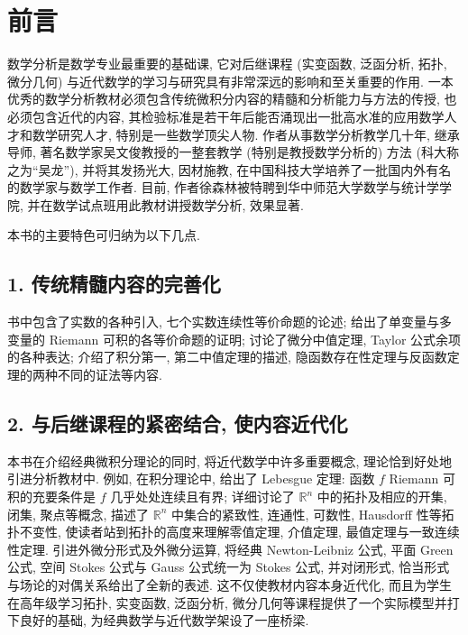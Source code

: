 
\chapter*{前言}

数学分析是数学专业最重要的基础课, 它对后继课程 (实变函数, 泛函分析, 拓扑, 微分几何) 与近代数学的学习与研究具有非常深远的影响和至关重要的作用. 一本优秀的数学分析教材必须包含传统微积分内容的精髓和分析能力与方法的传授, 也必须包含近代的内容, 其检验标准是若干年后能否涌现出一批高水准的应用数学人才和数学研究人才, 特别是一些数学顶尖人物. 作者从事数学分析教学几十年, 继承导师, 著名数学家吴文俊教授的一整套教学 (特别是教授数学分析的) 方法 (科大称之为``吴龙''), 并将其发扬光大, 因材施教, 在中国科技大学培养了一批国内外有名的数学家与数学工作者. 目前, 作者徐森林被特聘到华中师范大学数学与统计学学院, 并在数学试点班用此教材讲授数学分析, 效果显著.

本书的主要特色可归纳为以下几点.

\section*{1. 传统精髓内容的完善化}

书中包含了实数的各种引入, 七个实数连续性等价命题的论述; 给出了单变量与多变量的 Riemann 可积的各等价命题的证明; 讨论了微分中值定理, Taylor 公式余项的各种表达; 介绍了积分第一, 第二中值定理的描述, 隐函数存在性定理与反函数定理的两种不同的证法等内容.

\section*{2. 与后继课程的紧密结合, 使内容近代化}

本书在介绍经典微积分理论的同时, 将近代数学中许多重要概念, 理论恰到好处地引进分析教材中. 例如, 在积分理论中, 给出了 Lebesgue 定理: 函数 $f$ Riemann 可积的充要条件是 $f$ 几乎处处连续且有界; 详细讨论了 $\mathbb{R}^n$ 中的拓扑及相应的开集, 闭集, 聚点等概念, 描述了 $\mathbb{R}^n$ 中集合的紧致性, 连通性, 可数性, Hausdorff 性等拓扑不变性, 使读者站到拓扑的高度来理解零值定理, 介值定理, 最值定理与一致连续性定理. 引进外微分形式及外微分运算, 将经典 Newton-Leibniz 公式, 平面 Green 公式, 空间 Stokes 公式与 Gauss 公式统一为 Stokes 公式, 并对闭形式, 恰当形式与场论的对偶关系给出了全新的表述. 这不仅使教材内容本身近代化, 而且为学生在高年级学习拓扑, 实变函数, 泛函分析, 微分几何等课程提供了一个实际模型并打下良好的基础, 为经典数学与近代数学架设了一座桥梁.

